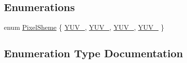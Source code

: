 \subsection*{Enumerations}
\begin{DoxyCompactItemize}
\item 
enum \hyperlink{namespaceGUI_a52432774abcaf0c8c417ae77739fccfc}{Pixel\+Sheme} \{ \hyperlink{namespaceGUI_a52432774abcaf0c8c417ae77739fccfca2e06ee24527f23dc25f617ad0f9713bc}{Y\+U\+V\+\_}, 
\hyperlink{namespaceGUI_a52432774abcaf0c8c417ae77739fccfca781089d5d11a2ece9648807b48a2eb3f}{Y\+U\+V\+\_}, 
\hyperlink{namespaceGUI_a52432774abcaf0c8c417ae77739fccfca3c43e5ef2c058b5c01a870d654cde699}{Y\+U\+V\+\_}, 
\hyperlink{namespaceGUI_a52432774abcaf0c8c417ae77739fccfcab10bce70451573b2d9e48c169151af93}{Y\+U\+V\+\_}
 \}
\end{DoxyCompactItemize}


\subsection{Enumeration Type Documentation}
\hypertarget{namespaceGUI_a52432774abcaf0c8c417ae77739fccfc}{}
